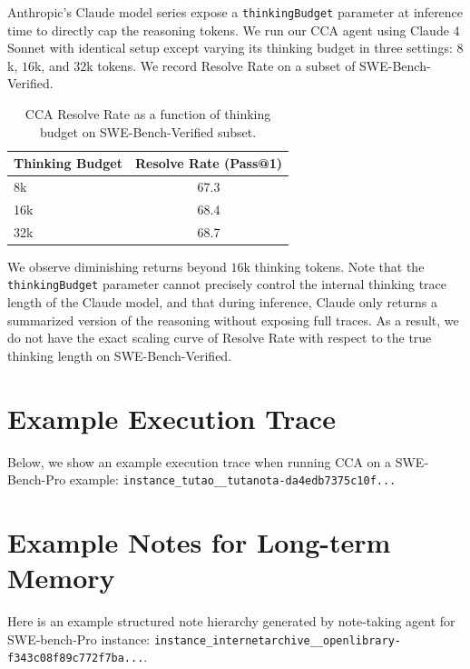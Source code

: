 Anthropic's Claude model series expose a \texttt{thinkingBudget} parameter at inference time to directly cap the reasoning tokens. We run our CCA agent using Claude 4 Sonnet with identical setup except varying its thinking budget in three settings: $8$k, $16$k, and $32$k tokens. We record Resolve Rate on a subset of SWE-Bench-Verified.

\begin{table}[h]
\centering
\begin{tabular}{l c}
\toprule
\textbf{Thinking Budget} & \textbf{Resolve Rate (Pass@1)} \\
\midrule
8k   & 67.3 \\
16k  & 68.4 \\
32k  & 68.7 \\
\bottomrule
\end{tabular}
\caption{CCA Resolve Rate as a function of thinking budget on SWE-Bench-Verified subset.}
\label{tab:thinking_budget}
\end{table}

We observe diminishing returns beyond $16$k thinking tokens. Note that the \texttt{thinkingBudget} parameter cannot precisely control the internal thinking trace length of the Claude model, and that during inference, Claude only returns a summarized version of the reasoning without exposing full traces. As a result, we do not have the exact scaling curve of Resolve Rate with respect to the true thinking length on SWE-Bench-Verified.

\section{Example Execution Trace}
\label{app:trace}

Below, we show an example execution trace when running CCA on a SWE-Bench-Pro example: \texttt{instance\_tutao\_\_tutanota-da4edb7375c10f...}





\section{Example Notes for Long-term Memory}
\label{app:notes}
Here is an example structured note hierarchy generated by note-taking agent for SWE-bench-Pro instance: \texttt{instance\_internetarchive\_\_openlibrary-f343c08f89c772f7ba...}.

